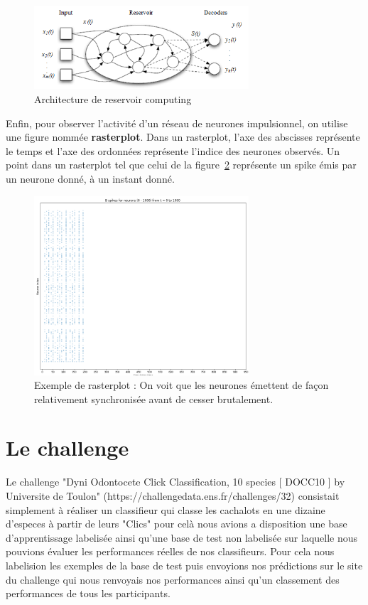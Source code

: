 \begin{figure}[h]
  \begin{center}
\includegraphics[width=8cm]{./images/Reservoir.png}
\end{center}
\caption{Architecture de reservoir computing}
\label{reservoir}
\end{figure}

Enfin, pour observer l'activité d'un réseau de neurones impulsionnel, on utilise une figure nommée \textbf{rasterplot}. Dans un rasterplot, l'axe des abscisses représente le temps et l'axe des ordonnées représente l'indice des neurones observés.
Un point dans un rasterplot tel que celui de la figure~\ref{principeRasterplot} représente un spike émis par un neurone donné, à un instant donné.

\begin{figure}[h]
  \begin{center}
  \includegraphics[width=8cm]{./images/SpikeB.png}
  \end{center}
  \caption{Exemple de rasterplot : On voit que les neurones émettent de façon relativement synchronisée avant de cesser brutalement.   }
  \label{principeRasterplot}
\end{figure}

\section{Le challenge}
\label{lechallenge}

Le challenge "Dyni Odontocete Click Classification, 10 species [ DOCC10 ]
by Universite de Toulon" (https://challengedata.ens.fr/challenges/32) consistait simplement à réaliser un classifieur qui classe les cachalots en une dizaine d'especes à partir de leurs "Clics" pour celà nous avions a disposition une base d'apprentissage labelisée ainsi qu'une base de test non labelisée sur laquelle nous pouvions évaluer les performances réelles de nos classifieurs. Pour cela nous labelision les exemples de la base de test puis envoyions nos prédictions sur le site du challenge qui nous renvoyais nos performances ainsi qu'un classement des performances de tous les participants.

